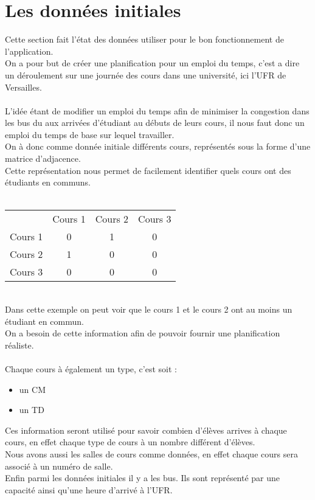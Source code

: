 \documentclass[a4paper,11pt]{article}
\begin{document}
\section{Les données initiales}
	Cette section fait l'état des données utiliser pour le bon fonctionnement de l'application.\\
	On a pour but de créer une planification pour un emploi du temps, c'est a dire un déroulement sur une journée des cours dans une université, ici l'UFR de Versailles.\\
	\\
	L'idée étant de modifier un emploi du temps afin de minimiser la congestion dans les bus du aux arrivées d'étudiant au débuts de leurs cours, il nous faut donc un emploi du temps de base sur lequel travailler.\\
	On à donc comme donnée initiale différents cours, représentés sous la forme d'une matrice d'adjacence. \\
	Cette représentation nous permet de facilement identifier quels cours ont des étudiants en communs.\\
	\\
	\begin{tabular}{ | c | c | c | c |}
		\hline			
		\       & Cours 1 & Cours 2 & Cours 3\\
		Cours 1 &   0     &    1    &     0  \\
		Cours 2 &   1     &    0    &     0  \\
		Cours 3 &   0     &    0    &     0  \\
		\hline  
	\end{tabular}\\
	Dans cette exemple on peut voir que le cours 1 et le cours 2 ont au moins un étudiant en commun.\\
	On a besoin de cette information afin de pouvoir fournir une planification réaliste.\\
	\\
	Chaque cours à également un type, c'est soit :
		\begin{itemize}
			\item un CM
			\item  un TD
		\end{itemize}
	Ces information seront utilisé pour savoir combien d'élèves arrives à chaque cours, en effet chaque type de cours à un nombre différent d'élèves.\\
	Nous avons aussi les salles de cours comme données, en effet chaque cours sera associé à un numéro de salle.
	\\
	Enfin parmi les données initiales il y a les bus. Ils sont représenté par une capacité ainsi qu'une heure d'arrivé à l'UFR. 
\end{document}
